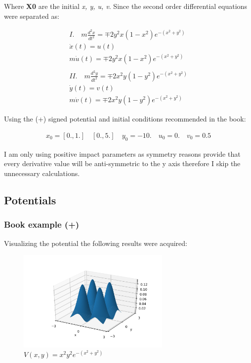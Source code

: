 \documentclass[a4paper,12pt]{article}
\begin{document}
\par Where \textbf{X0} are the initial \textit{x, y, u, v}. Since the second order
differential equations were separated as:

\begin{align*}
	I. \quad m\frac{d^{2}x}{dt^{2}} = \mp 2y^{2}x(1-x^{2})e^{-(x^{2}+y^{2})}  \\
	\dot{x}(t) = u(t)                                                         \\
	m\dot{u}(t) = \mp 2y^{2}x(1-x^{2})e^{-(x^{2}+y^{2})}                      \\ \\
	II. \quad m\frac{d^{2}y}{dt^{2}} = \mp 2x^{2}y(1-y^{2})e^{-(x^{2}+y^{2})} \\
	\dot{y}(t) = v(t)                                                         \\
	m\dot{v}(t) = \mp 2x^{2}y(1-y^{2})e^{-(x^{2}+y^{2})}
\end{align*}

\par Using the (+) signed potential and initial conditions recommended in the book:

\begin{align*}
	x_{0} = [0. , 1.] \quad [0., 5.] \quad
	y_{0} = -10. \quad
	u_{0} = 0. \quad
	v_{0} = 0.5
\end{align*}

\par I am only using positive impact parameters as symmetry reasons provide that
every derivative value will be anti-symmetric to the y axis therefore I skip the
unnecessary calculations.

\subsection{Potentials}

\subsubsection{Book example (+)}

\par Visualizing the potential the following results were acquired:

\begin{figure}[H]
	\centering
	\includegraphics[width=0.66\textwidth]{./four_peaks.png}
	\caption{ $V(x,y) = x^{2}y^{2}e^{-(x^{2}+y^{2})}$ }
\end{figure}
\end{document}
